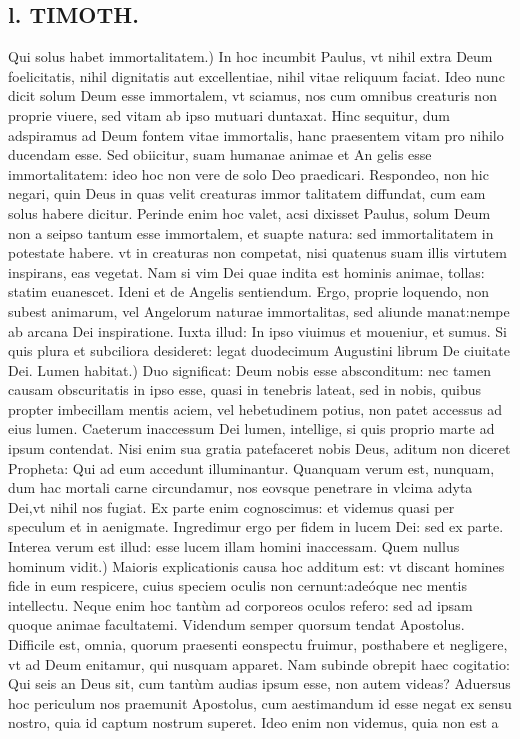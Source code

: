 \documentclass{article}
\begin{document}
\begin{pages}
\section*{l. TIMOTH. }
\marginpar{[ p.82 ]}\pstart Qui solus habet immortalitatem.) In hoc incumbit Paulus, vt nihil extra Deum foelicitatis, nihil dignitatis aut excellentiae, nihil vitae reliquum faciat. Ideo nunc dicit solum Deum esse immortalem, vt sciamus, nos cum omnibus creaturis non proprie viuere, sed vitam ab ipso mutuari duntaxat. Hinc sequitur, dum adspiramus ad Deum fontem vitae immortalis, hanc praesentem vitam pro nihilo ducendam esse. Sed obiicitur, suam humanae animae et An gelis esse immortalitatem: ideo hoc non vere de solo Deo praedicari. Respondeo, non hic negari, quin Deus in quas velit creaturas immor talitatem diffundat, cum eam solus habere dicitur. Perinde enim hoc valet, acsi dixisset Paulus, solum Deum non a seipso tantum esse immortalem, et suapte natura: sed immortalitatem in potestate habere. vt in creaturas non competat, nisi quatenus suam illis virtutem inspirans, eas vegetat. Nam si vim Dei quae indita est hominis animae, tollas: statim euanescet. Ideni et de Angelis sentiendum. Ergo, proprie loquendo, non subest animarum, vel Angelorum naturae immortalitas, sed aliunde manat:nempe ab arcana Dei inspiratione. Iuxta illud: In ipso viuimus et moueniur, et sumus. Si quis plura et subciliora desideret: legat duodecimum Augustini librum De ciuitate Dei.  \pend\pstart Lumen habitat.) Duo significat: Deum nobis esse absconditum: nec tamen causam obscuritatis in ipso esse, quasi in tenebris lateat, sed in nobis, quibus propter imbecillam mentis aciem, vel hebetudinem potius, non patet accessus ad eius lumen. Caeterum inaccessum Dei lumen, intellige, si quis proprio marte ad ipsum contendat. Nisi enim sua gratia patefaceret nobis Deus, aditum non diceret Propheta: Qui ad eum accedunt illuminantur. Quanquam verum est, nunquam, dum hac mortali carne circundamur, nos eovsque penetrare in vlcima adyta Dei,vt nihil nos fugiat. Ex parte enim cognoscimus: et videmus quasi per speculum et in aenigmate. Ingredimur ergo per fidem in lucem Dei: sed ex parte. Interea verum est illud: esse lucem illam homini inaccessam.  \pend\pstart Quem nullus hominum vidit.) Maioris explicationis causa hoc additum est: vt discant homines fide in eum respicere, cuius speciem oculis non cernunt:adeóque nec mentis intellectu. Neque enim hoc tantùm ad corporeos oculos refero: sed ad ipsam quoque animae facultatemi. Videndum semper quorsum tendat Apostolus. Difficile est, omnia, quorum praesenti eonspectu fruimur, posthabere et negligere, vt ad Deum enitamur, qui nusquam apparet. Nam subinde obrepit haec cogitatio: Qui seis an Deus sit, cum tantùm audias ipsum esse, non autem videas? Aduersus hoc periculum nos praemunit Apostolus, cum aestimandum id esse negat ex sensu nostro, quia id captum nostrum superet. Ideo enim non videmus, quia non est a\pend

\end{pages}
\end{document}
